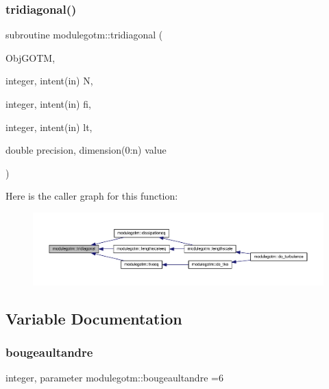 \subsubsection{\texorpdfstring{tridiagonal()}{tridiagonal()}}
{\footnotesize\ttfamily subroutine modulegotm\+::tridiagonal (\begin{DoxyParamCaption}\item[{}]{Obj\+G\+O\+TM,  }\item[{integer, intent(in)}]{N,  }\item[{integer, intent(in)}]{fi,  }\item[{integer, intent(in)}]{lt,  }\item[{double precision, dimension(0\+:n)}]{value }\end{DoxyParamCaption})\hspace{0.3cm}{\ttfamily [private]}}

Here is the caller graph for this function\+:\nopagebreak
\begin{figure}[H]
\begin{center}
\leavevmode
\includegraphics[width=350pt]{namespacemodulegotm_a95c763a61ad96de7516848ea4a686fdb_icgraph}
\end{center}
\end{figure}


\subsection{Variable Documentation}
\mbox{\label{namespacemodulegotm_a55510aacb7d64ac380e762ba61964376}} 
\subsubsection{\texorpdfstring{bougeaultandre}{bougeaultandre}}
{\footnotesize\ttfamily integer, parameter modulegotm\+::bougeaultandre =6\hspace{0.3cm}{\ttfamily [private]}}

\mbox{\label{namespacemodulegotm_a9ee68515a5fff9c9166a6b82ed456933}} 
